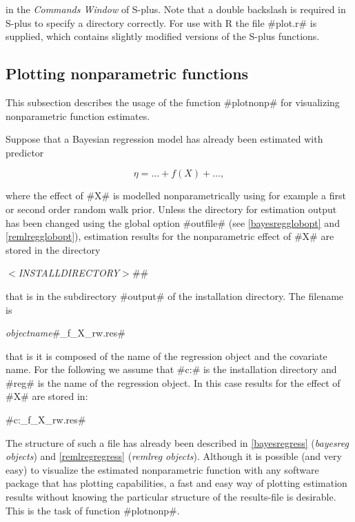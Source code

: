 in the {\em Commands Window} of S-plus. Note that a double backslash
is required in S-plus to specify a directory correctly. For use with
R the file #plot.r# is supplied, which contains slightly modified
versions of the S-plus functions.

\subsection{Plotting nonparametric functions} \label{splusplotnonp}
  

This subsection describes the usage of the function #plotnonp# for
visualizing nonparametric function estimates.

Suppose that a Bayesian regression model has already been
estimated with predictor

$$
\eta = \dots + f(X) + \dots,
$$

where the effect of #X# is modelled nonparametrically using for
example a first or second order random walk prior. Unless the
directory for estimation output has been changed using the global
option #outfile# (see \autoref{bayesregglobopt} and
\autoref{remlregglobopt}), estimation results for the
nonparametric effect of #X# are stored in the directory

{\em$<$INSTALLDIRECTORY$>$}#\output#

that is in the subdirectory #output# of the installation
directory. The filename is

{\em objectname}#_f_X_rw.res#

that is it is composed of the name of the regression object and
the covariate name. For the following we assume that #c:\bayes# is
the installation directory and #reg# is the name of the regression
object. In this case results for the effect of #X# are stored in:

#c:\bayes\output\reg_f_X_rw.res#

The structure of such a file has already been described in
\autoref{bayesregress} ({\em bayesreg objects}) and
\autoref{remlregregress} ({\em remlreg objects}). Although it is
possible (and very easy) to visualize the estimated nonparametric
function with any software package that has plotting capabilities, a
fast and easy way of plotting estimation results without knowing the
particular structure of the results-file is desirable. This is the
task of function #plotnonp#.

